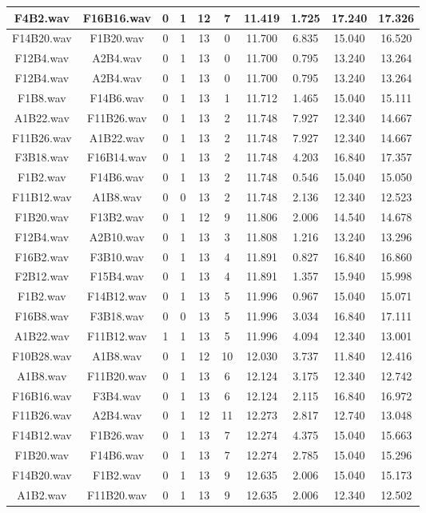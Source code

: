 \documentclass[11pt,a4paper,twoside]{book}
\begin{document}
\begin{longtable}[c]{|c|c|c|c|c|c|c|c|c|c|}
F4B2.wav&F16B16.wav&0&1&12&7&11.419&1.725&17.240&17.326\\ \hline
F14B20.wav&F1B20.wav&0&1&13&0&11.700&6.835&15.040&16.520\\ \hline
F12B4.wav&A2B4.wav&0&1&13&0&11.700&0.795&13.240&13.264\\ \hline
F12B4.wav&A2B4.wav&0&1&13&0&11.700&0.795&13.240&13.264\\ \hline
F1B8.wav&F14B6.wav&0&1&13&1&11.712&1.465&15.040&15.111\\ \hline
A1B22.wav&F11B26.wav&0&1&13&2&11.748&7.927&12.340&14.667\\ \hline
F11B26.wav&A1B22.wav&0&1&13&2&11.748&7.927&12.340&14.667\\ \hline
F3B18.wav&F16B14.wav&0&1&13&2&11.748&4.203&16.840&17.357\\ \hline
F1B2.wav&F14B6.wav&0&1&13&2&11.748&0.546&15.040&15.050\\ \hline
F11B12.wav&A1B8.wav&0&0&13&2&11.748&2.136&12.340&12.523\\ \hline
F1B20.wav&F13B2.wav&0&1&12&9&11.806&2.006&14.540&14.678\\ \hline
F12B4.wav&A2B10.wav&0&1&13&3&11.808&1.216&13.240&13.296\\ \hline
F16B2.wav&F3B10.wav&0&1&13&4&11.891&0.827&16.840&16.860\\ \hline
F2B12.wav&F15B4.wav&0&1&13&4&11.891&1.357&15.940&15.998\\ \hline
F1B2.wav&F14B12.wav&0&1&13&5&11.996&0.967&15.040&15.071\\ \hline
F16B8.wav&F3B18.wav&0&0&13&5&11.996&3.034&16.840&17.111\\ \hline
A1B22.wav&F11B12.wav&1&1&13&5&11.996&4.094&12.340&13.001\\ \hline
F10B28.wav&A1B8.wav&0&1&12&10&12.030&3.737&11.840&12.416\\ \hline
A1B8.wav&F11B20.wav&0&1&13&6&12.124&3.175&12.340&12.742\\ \hline
F16B16.wav&F3B4.wav&0&1&13&6&12.124&2.115&16.840&16.972\\ \hline
F11B26.wav&A2B4.wav&0&1&12&11&12.273&2.817&12.740&13.048\\ \hline
F14B12.wav&F1B26.wav&0&1&13&7&12.274&4.375&15.040&15.663\\ \hline
F1B20.wav&F14B6.wav&0&1&13&7&12.274&2.785&15.040&15.296\\ \hline
F14B20.wav&F1B2.wav&0&1&13&9&12.635&2.006&15.040&15.173\\ \hline
A1B2.wav&F11B20.wav&0&1&13&9&12.635&2.006&12.340&12.502\\ \hline

\end{longtable}
\end{document}
